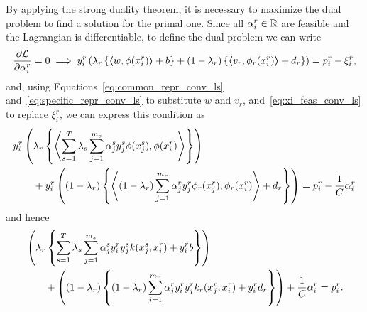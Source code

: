 By applying the strong duality theorem, it is necessary to maximize the dual problem to find a solution for the primal one. Since all $\alpha_i^r \in \mathbb{R}$ are feasible and the Lagrangian is differentiable, to define the dual problem we can write
\begin{equation}
    \nonumber
    \frac{\partial \mathcal{L}}{\partial \alpha_i^r} = 0 \implies y_{i}^r \left(\lambda_r \left\lbrace \bm{\left\langle} w, \phi(x_{i}^r) \bm{\right\rangle} + b  \right\rbrace + (1 - \lambda_r) \left\lbrace \bm{\left\langle} {v}_r, \phi_r(x_{i}^r) \bm{\right\rangle} + d_r \right\rbrace  \right) = p_{i}^r - \xi_{i}^r  ,
\end{equation}
and, using Equations~\eqref{eq:common_repr_conv_ls} and~\eqref{eq:specific_repr_conv_ls} to substitute $w$ and $v_r$, and~\eqref{eq:xi_feas_conv_ls} to replace $\xi_i^r$, we can express this condition as 
\begin{equation}
    \nonumber
    \begin{aligned}
        &y_{i}^r \left(\lambda_r \left\lbrace \left\langle\sum_{s= 1}^T \lambda_s \sum_{j=1}^{m_s} {\alpha_j^s} y_j^s \phi(x_j^s) , \phi(x_{i}^r) \right\rangle  \right\rbrace \right) \\
        &\qquad+ y_{i}^r \left( (1 - \lambda_r) \left\lbrace \left\langle (1 - \lambda_r) \sum_{j=1}^{m_r} {\alpha_j^r}  y_j^r \phi_r(x_j^r) , \phi_r(x_{i}^r) \right\rangle + d_r \right\rbrace  \right) = p_{i}^r - \frac{1}{C}\alpha_{i}^r  \\
    \end{aligned}
\end{equation}
and hence
\begin{equation}
    \nonumber
    \begin{aligned}
        &\left(\lambda_r \left\lbrace \sum_{s= 1}^T \lambda_s \sum_{j=1}^{m_s} {\alpha_j^s} y_{i}^r y_j^s k(x_j^s, x_{i}^r)  + y_i^r b \right\rbrace \right) \\
        &\qquad+  \left( (1 - \lambda_r) \left\lbrace (1 - \lambda_r) \sum_{j=1}^{m_r} {\alpha_j^r} y_{i}^r  y_j^r k_r(x_j^r, x_{i}^r)  + y_i^r d_r \right\rbrace  \right) + \frac{1}{C}\alpha_{i}^r  = p_{i}^r .
    \end{aligned}
\end{equation}

